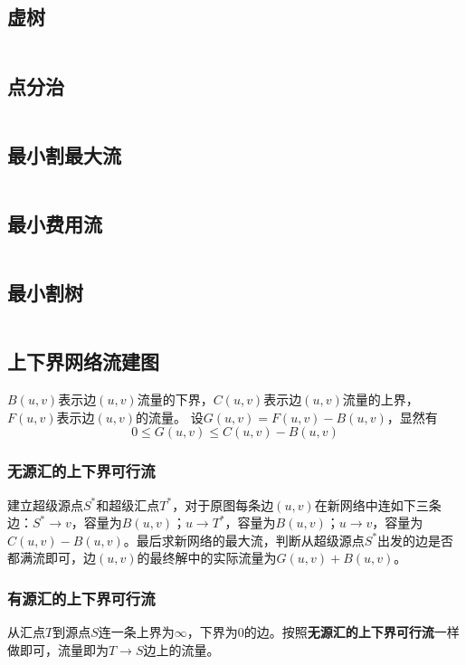 \subsection{虚树}
\inputminted{cpp}{\source/graph-theory/mirage-tree.cpp}
\subsection{点分治}
\inputminted{cpp}{\source/graph-theory/vertex-partition.cpp}
\subsection{最小割最大流}
\inputminted{cpp}{\source/graph-theory/dinic.cpp}
\subsection{最小费用流}
\inputminted{cpp}{\source/graph-theory/mincost-maxflow.cpp}
\subsection{最小割树}
\inputminted{cpp}{\source/graph-theory/GH-tree.cpp}
\subsection{上下界网络流建图}
$B(u,v)$表示边$(u,v)$流量的下界，$C(u,v)$表示边$(u,v)$流量的上界，$F(u,v)$表示边$(u,v)$的流量。
设$G(u,v) = F(u,v) - B(u,v)$，显然有
$$0 \leq G(u,v) \leq C(u,v)-B(u,v)$$
\subsubsection{无源汇的上下界可行流}
建立超级源点$S^*$和超级汇点$T^*$，对于原图每条边$(u,v)$在新网络中连如下三条边：$S^* \rightarrow v$，容量为$B(u,v)$；$u \rightarrow T^*$，容量为$B(u,v)$；$u \rightarrow v$，容量为$C(u,v) - B(u,v)$。最后求新网络的最大流，判断从超级源点$S^*$出发的边是否都满流即可，边$(u,v)$的最终解中的实际流量为$G(u,v)+B(u,v)$。
\subsubsection{有源汇的上下界可行流}
从汇点$T$到源点$S$连一条上界为$\infty$，下界为$0$的边。按照\textbf{无源汇的上下界可行流}一样做即可，流量即为$T \rightarrow S$边上的流量。
